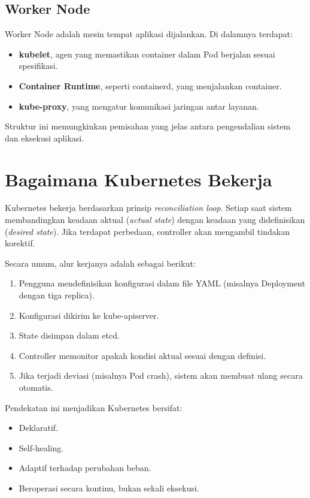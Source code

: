 \subsection{Worker Node}

Worker Node adalah mesin tempat aplikasi dijalankan. 
Di dalamnya terdapat:

\begin{itemize}
    \item \textbf{kubelet}, agen yang memastikan container dalam Pod berjalan sesuai spesifikasi.
    \item \textbf{Container Runtime}, seperti containerd, yang menjalankan container.
    \item \textbf{kube-proxy}, yang mengatur komunikasi jaringan antar layanan.
\end{itemize}

Struktur ini memungkinkan pemisahan yang jelas antara pengendalian sistem dan eksekusi aplikasi.

\section{Bagaimana Kubernetes Bekerja}

Kubernetes bekerja berdasarkan prinsip \textit{reconciliation loop}. 
Setiap saat sistem membandingkan keadaan aktual (\textit{actual state}) dengan keadaan yang didefinisikan (\textit{desired state}). 
Jika terdapat perbedaan, controller akan mengambil tindakan korektif.

Secara umum, alur kerjanya adalah sebagai berikut:

\begin{enumerate}
    \item Pengguna mendefinisikan konfigurasi dalam file YAML (misalnya Deployment dengan tiga replica).
    \item Konfigurasi dikirim ke kube-apiserver.
    \item State disimpan dalam etcd.
    \item Controller memonitor apakah kondisi aktual sesuai dengan definisi.
    \item Jika terjadi deviasi (misalnya Pod crash), sistem akan membuat ulang secara otomatis.
\end{enumerate}

Pendekatan ini menjadikan Kubernetes bersifat:

\begin{itemize}
    \item Deklaratif.
    \item Self-healing.
    \item Adaptif terhadap perubahan beban.
    \item Beroperasi secara kontinu, bukan sekali eksekusi.
\end{itemize}

